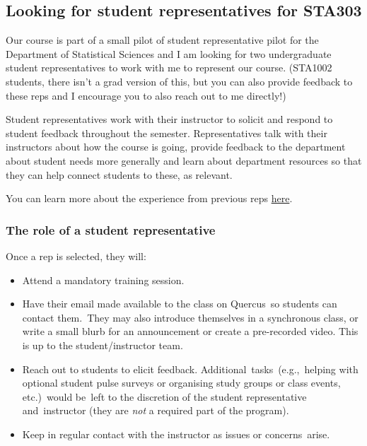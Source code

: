 \documentclass[
  openany]{book}
\begin{document}
\hypertarget{studentrep}{%
\subsection{Looking for student representatives for STA303}\label{studentrep}}

Our course is part of a small pilot of student representative pilot for the Department of Statistical Sciences and I am looking for two undergraduate student representatives to work with me to represent our course. (STA1002 students, there isn't a grad version of this, but you can also provide feedback to these reps and I encourage you to also reach out to me directly!)

Student representatives work with their instructor to solicit and respond to student feedback throughout the semester. Representatives talk with their instructors about how the course is going, provide feedback to the department about student needs more generally and learn about department resources so that they can help connect students to these, as relevant.

You can learn more about the experience from previous reps \href{https://www.statistics.utoronto.ca/news/new-pilot-program-enhances-academic-experience-giving-students-voice}{here}.

\hypertarget{the-role-of-a-student-representative}{%
\subsubsection{The role of a student representative}\label{the-role-of-a-student-representative}}

Once a rep is selected, they will:

\begin{itemize}
\item
  Attend a mandatory training session.
\item
  Have their email made available to the class on Quercus~so students can contact them.~They may also introduce themselves in a synchronous class, or write a small blurb for an announcement or create a pre-recorded video. This is up to the student/instructor team.
\item
  Reach out to students to elicit feedback. Additional~tasks~(e.g.,~helping with optional student pulse surveys or organising study groups or class events, etc.)~would be~left to the discretion of the student representative and~instructor (they are \emph{not} a required part of the program).~~
\item
  Keep in regular contact with the instructor as issues or concerns~arise.
\end{itemize}
\end{document}
